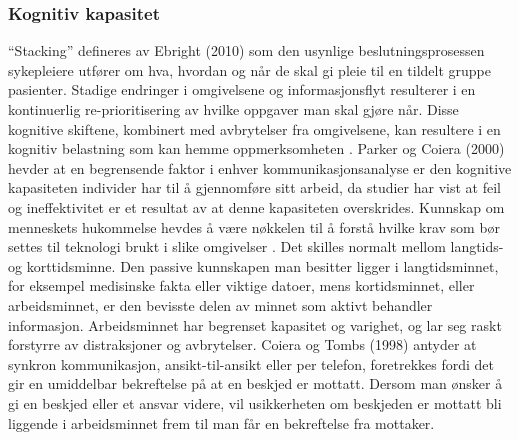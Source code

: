\subsubsection{Kognitiv kapasitet}
“Stacking” defineres av Ebright (2010) som den usynlige beslutningsprosessen sykepleiere utfører om hva, hvordan og når de skal gi pleie til en tildelt gruppe pasienter. Stadige endringer i omgivelsene og informasjonsflyt resulterer i en kontinuerlig re-prioritisering av hvilke oppgaver man skal gjøre når. Disse kognitive skiftene, kombinert med avbrytelser fra omgivelsene, kan resultere i en kognitiv belastning som kan hemme oppmerksomheten \cite{Ebright10}. Parker og Coiera (2000) hevder at en begrensende faktor i enhver kommunikasjonsanalyse er den kognitive kapasiteten individer har til å gjennomføre sitt arbeid, da studier har vist at feil og ineffektivitet er et resultat av at denne kapasiteten overskrides. Kunnskap om menneskets hukommelse hevdes å være nøkkelen til å forstå hvilke krav som bør settes til teknologi brukt i slike omgivelser \cite{Parker00}. Det skilles normalt mellom langtids- og korttidsminne. Den passive kunnskapen man besitter ligger i langtidsminnet, for eksempel medisinske fakta eller viktige datoer, mens kortidsminnet, eller arbeidsminnet, er den bevisste delen av minnet som aktivt behandler informasjon. Arbeidsminnet har begrenset kapasitet og varighet, og lar seg raskt forstyrre av distraksjoner og avbrytelser. Coiera og Tombs (1998) antyder at synkron kommunikasjon, ansikt-til-ansikt eller per telefon, foretrekkes fordi det gir en umiddelbar bekreftelse på at en beskjed er mottatt. Dersom man ønsker å gi en beskjed eller et ansvar videre, vil usikkerheten om beskjeden er mottatt bli liggende i arbeidsminnet frem til man får en bekreftelse fra mottaker. 

